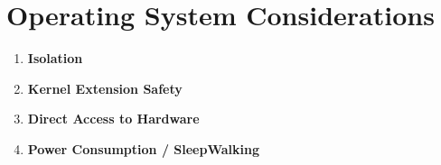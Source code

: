 \section{Operating System Considerations}

\begin{enumerate}
\item \bf{Isolation}

\item \bf{Kernel Extension Safety}

\item \bf{Direct Access to Hardware}

\item \bf{Power Consumption / SleepWalking}
\end{enumerate}
